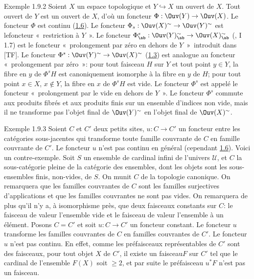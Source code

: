 \begin{enonce*}[remark]{Exemple 1.9.2}
Soient $X$ un espace topologique et $Y\hookrightarrow X$ un ouvert
de $X$. Tout ouvert de $Y$ est un ouvert de $X$, d'où un foncteur
$\Phi:\Ouv(Y)\rightarrow \Ouv(X)$. Le foncteur $\Phi$ est continu
(\hyperref[III.prop1.6]{1.6}). Le foncteur $\Phi_s:\Ouv(X)^{\sim}\rightarrow
\Ouv(Y)^{\sim}$ est le\pageoriginale foncteur « restriction à
$Y$ ». Le foncteur $\Phi^s_{\ab}:\Ouv(Y)^{\sim}_{\ab}\rightarrow
\Ouv(X)^{\sim}_{\ab}$ (, I 1.7) est le
foncteur « prolongement par zéro en dehors de $Y$ »\
introduit dans [TF]. Le foncteur $\Phi^s:\Ouv(Y)^{\sim}\rightarrow
\Ouv(X)^{\sim}$ (\hyperref[III.prop1.3]{1.3}) est analogue au foncteur « prolongement par zéro »: pour tout faisceau $H$ sur $Y$ et
tout point $y\in Y$, la fibre en $y$ de $\Phi^sH$ est canoniquement
isomorphe à la fibre en $y$ de $H$; pour tout point $x\in X$,
$x\not\in Y$, la fibre en $x$ de $\Phi^sH$ est vide. Le foncteur
$\Phi^s$ est appelé le foncteur « prolongement par le vide en
dehors de $Y$ ». Le foncteur $\Phi^s$ commute aux produits
fibrés et aux produits finis sur un ensemble d'indices non vide,
mais il ne transforme pas l'objet final de $\Ouv(Y)^{\sim}$ en
l'objet final de $\Ouv(X)^{\sim}$.
\end{enonce*}

\begin{enonce*}[remark]{Exemple 1.9.3}
Soient $C$ et $C'$ deux petits sites, $u:C\rightarrow C'$ un
foncteur entre les catégories sous-jacentes qui transforme toute
famille couvrante de $C$ en famille couvrante de $C'$. Le foncteur
$u$ n'est pas continu en général (\cf cependant
\hyperref[III.prop1.6]{1.6}). Voici un contre-exemple. Soit $S$ un ensemble de
cardinal infini de l'univers $𝒰$, et $C$ la
sous-catégorie pleine de la catégorie des ensembles, dont
les objets sont les sous-ensembles finis, non-vides, de $S$. On
munit $C$ de la topologie canonique. On remarquera que les familles
couvrantes de $C$ sont les familles surjectives d'applications et
que les familles couvrantes ne sont pas vides. On remarquera de plus
qu'il n'y a, à isomorphisme près, que deux faisceaux constants
sur $C$: le faisceau de valeur l'ensemble vide et le faisceau de
valeur l'ensemble à un élément. Posons $C=C'$ et soit
$u:C\rightarrow C'$ un foncteur constant. Le foncteur $u$ transforme
les familles couvrantes de $C$ en familles couvrantes de $C'$. Le
foncteur $u$ n'est pas continu. En effet, comme les préfaisceaux
représentables de $C'$ sont des faisceaux, pour tout objet $X$
de $C'$, il existe un faisceau\pageoriginale $F$ sur $C'$ tel que le
cardinal de l'ensemble $F(X)$ soit $\geq 2$, et par suite le
préfaisceau $u^\ast F$ n'est pas un faisceau.
\end{enonce*}

